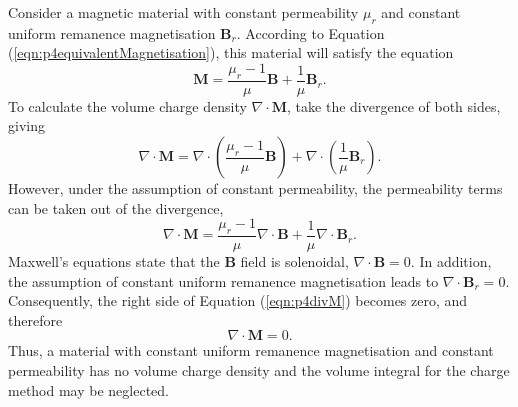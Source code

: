 Consider a magnetic material with constant permeability \(\mu_r\) and constant uniform remanence magnetisation \(\mathbf{B}_r\). According to Equation (\ref{eqn:p4equivalentMagnetisation}), this material will satisfy the equation
\begin{equation}
    \mathbf{M} = \frac{\mu_r - 1}{\mu} \mathbf{B} + \frac{1}{\mu} \mathbf{B}_r \text{.}
\end{equation}
To calculate the volume charge density \(\nabla \cdot \mathbf{M}\), take the divergence of both sides, giving
\begin{equation}
    \nabla \cdot \mathbf{M} = \nabla \cdot \left( \frac{\mu_r - 1}{\mu} \mathbf{B} \right) + \nabla \cdot \left( \frac{1}{\mu} \mathbf{B}_r \right) \text{.}
\end{equation}
However, under the assumption of constant permeability, the permeability terms can be taken out of the divergence,
\begin{equation}\label{eqn:p4divM}
    \nabla \cdot \mathbf{M} = \frac{\mu_r - 1}{\mu} \nabla \cdot \mathbf{B} + \frac{1}{\mu} \nabla \cdot \mathbf{B}_r \text{.}
\end{equation}
Maxwell's equations state that the \(\mathbf{B}\) field is solenoidal, \(\nabla \cdot \mathbf{B} = 0\). In addition, the assumption of constant uniform remanence magnetisation leads to \(\nabla \cdot \mathbf{B}_r = 0\). Consequently, the right side of Equation (\ref{eqn:p4divM}) becomes zero, and therefore
\begin{equation}
    \nabla \cdot \mathbf{M} = 0 \text{.}
\end{equation}
Thus, a material with constant uniform remanence magnetisation and constant permeability has no volume charge density and the volume integral for the charge method may be neglected.